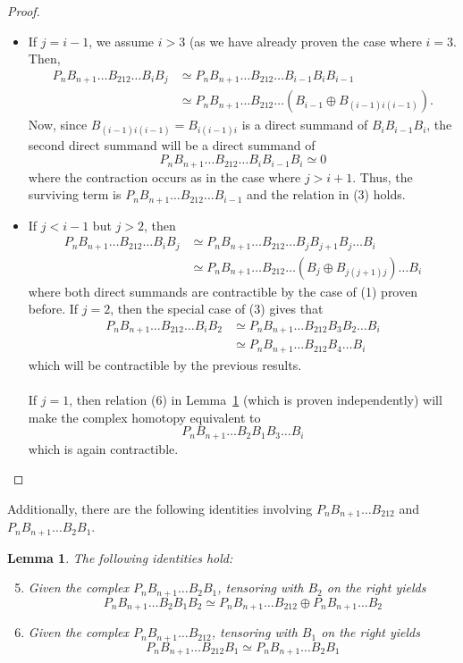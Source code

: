 \documentclass[11pt]{article}
\newtheorem{lemma}[thm]{Lemma}
\theoremstyle{definition}
\theoremstyle{remark}
\numberwithin{equation}{section}
\begin{document}
\begin{proof}
\begin{itemize}
	\item If $j = i-1$, we assume $i > 3$ (as we have already proven the
		case where $i =3$. Then,
		\begin{align*}
		P_nB_{n+1}\dots B_{212}\dots B_iB_j &\simeq
		P_nB_{n+1}\dots B_{212} \dots B_{i-1}B_iB_{i-1}\\
		&\simeq P_{n}B_{n+1}\dots B_{212}\dots (B_{i-1}\oplus
		B_{(i-1)i(i-1)}).
\end{align*}
Now, since $B_{(i-1)i(i-1)}=B_{i(i-1)i}$ is a direct summand of
$B_iB_{i-1}B_i$, the second direct summand will be a direct summand of
\[P_nB_{n+1}\dots B_{212}\dots B_iB_{i-1}B_i\simeq 0\]
where the contraction occurs as in the case where $j > i+1$. Thus, the surviving
term is $P_nB_{n+1}\dots B_{212}\dots B_{i-1}$ and the relation in (3) holds.
\item If $j < i-1$ but $j >2$, then 
	\begin{align*}
	P_nB_{n+1}\dots B_{212}\dots B_iB_j &\simeq 
	P_nB_{n+1}\dots B_{212}\dots B_jB_{j+1}B_j \dots B_i \\
					    &\simeq P_nB_{n+1}\dots
					    B_{212}\dots (B_j \oplus
					    B_{j(j+1)j})\dots B_i
	\end{align*}
	where both direct summands are contractible by the case of (1)
	proven before. If $j=2$, then the special case of (3) gives that
	\begin{align*}
		P_nB_{n+1}\dots B_{212}\dots B_iB_2 &\simeq
		P_nB_{n+1}\dots B_{212}B_3B_2\dots B_i \\
		&\simeq P_nB_{n+1}\dots B_{212}B_4 \dots B_i
	\end{align*}
	which will be contractible by the previous results.
	\\ \\
	If
	$j=1$, then relation (6) in
	Lemma~\ref{lem:basicmultiplications2} (which is proven independently)
	will make the complex homotopy equivalent to
	\[P_nB_{n+1}\dots B_{2}B_1 B_3 \dots B_i\]
	which is again contractible.
\end{itemize}
\end{proof}
\noindent Additionally, there are the following identities involving
$P_nB_{n+1}\dots B_{212}$ and $P_nB_{n+1}\dots B_{2}B_1$.
\begin{lemma}
	\label{lem:basicmultiplications2}
	The following identities hold:
\begin{enumerate}[label=(\arabic*)]
	\setcounter{enumi}{4}
	\item Given the complex $P_nB_{n+1}\dots B_{2}B_1$, tensoring with
	$B_2$ on the right yields
\[P_nB_{n+1}\dots B_{2}B_1B_2\simeq
P_nB_{n+1}\dots B_{212} \oplus P_nB_{n+1}\dots B_{2}\]
\item Given the complex $P_nB_{n+1}\dots B_{212}$, tensoring with $B_1$ on the
	right yields
	\[P_nB_{n+1}\dots B_{212}B_1\simeq
	P_nB_{n+1}\dots B_2 B_1\]
	\end{enumerate}
\end{lemma}
\end{document}
